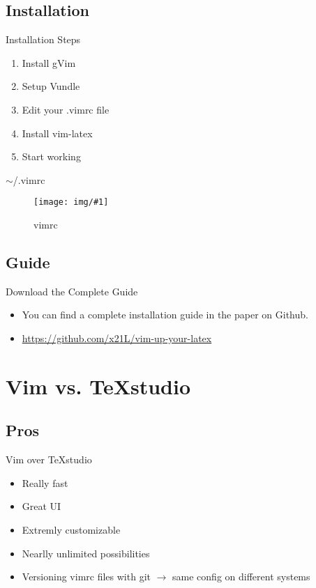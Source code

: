 \documentclass[aspectratio=169]{beamer}
\newenvironment{MyPicture}[4]{
  \begin{figure}[h!]
    \centering
    \texttt{[image: img/\#1]}
    \caption{#2}
    \label{fig:#3}
  }
{\end{figure}}
\begin{document}
\subsection{Installation}
\begin{frame}{Installation Steps}
  \begin{enumerate}
    \item Install gVim
    \item Setup Vundle
    \item Edit your .vimrc file
    \item Install vim-latex
    \item Start working
  \end{enumerate}
\end{frame}
\begin{frame}{$\sim$/.vimrc}
  \begin{MyPicture}{vimrc}{vimrc}{vimrc}{width=0.5\textwidth}
  \end{MyPicture}
\end{frame}
\subsection{Guide}
\begin{frame}{Download the Complete Guide}
  \begin{itemize}
    \item You can find a complete installation guide in the paper on Github.
      \item \url{https://github.com/x21L/vim-up-your-latex}
  \end{itemize}
\end{frame}
\section{Vim vs. TeXstudio}
\subsection{Pros}
\begin{frame}{Vim over TeXstudio}
  \begin{itemize}
    \item Really fast
    \item Great UI
    \item Extremly customizable
    \item Nearlly unlimited possibilities
    \item Versioning vimrc files with git $\rightarrow$ same config on different systems
  \end{itemize}
\end{frame}
\end{document}
